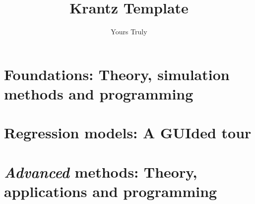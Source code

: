\documentclass[krantz1]{krantz} %
\begin{document}
\frontmatter

\title{Krantz Template} %
\author{Yours Truly}





\locpage



\cleardoublepage
\setcounter{page}{7} %
\tableofcontents




\mainmatter

\part{Foundations: Theory, simulation methods and programming}





\part{Regression models: A GUIded tour}





\part{\textit{Advanced} methods: Theory, applications and programming}









\printindex
\end{document}
